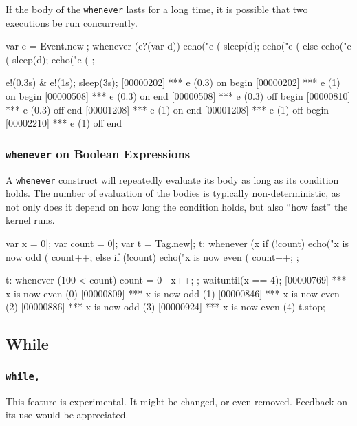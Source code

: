 If the body of the \lstinline|whenever| lasts for a long time, it is
possible that two executions be run concurrently.

\begin{urbiscript}
var e = Event.new|;
whenever (e?(var d))
  {
    echo("e (%
    sleep(d);
    echo("e (%
  }
else
  {
    echo("e (%
    sleep(d);
    echo("e (%
  };

e!(0.3s) & e!(1s);
sleep(3s);
[00000202] *** e (0.3) on begin
[00000202] *** e (1) on begin
[00000508] *** e (0.3) on end
[00000508] *** e (0.3) off begin
[00000810] *** e (0.3) off end
[00001208] *** e (1) on end
[00001208] *** e (1) off begin
[00002210] *** e (1) off end
\end{urbiscript}

\subsubsection{\lstinline'whenever' on Boolean Expressions}

A \lstinline'whenever' construct will repeatedly evaluate its body as
long as its condition holds.  The number of evaluation of the bodies
is typically non-deterministic, as not only does it depend on how
long the condition holds, but also ``how fast'' the \urbi kernel runs.

\begin{urbiscript}
var x = 0|;
var count = 0|;
var t = Tag.new|;
t:
  whenever (x %
  {
    if (!count)
      echo("x is now odd (%
    count++;
  }
  else
  {
    if (!count)
      echo("x is now even (%
    count++;
  };

t:
  whenever (100 < count)
  {
    count = 0 |
    x++;
  };
waituntil(x == 4);
[00000769] *** x is now even (0)
[00000809] *** x is now odd (1)
[00000846] *** x is now even (2)
[00000886] *** x is now odd (3)
[00000924] *** x is now even (4)
t.stop;
\end{urbiscript}


\subsection{While}
\subsubsection{\lstinline|while,|}
\label{sec:lang:while:comma}

\begin{note}
  This feature is experimental.  It might be changed, or even removed.
  Feedback on its use would be appreciated.
\end{note}

